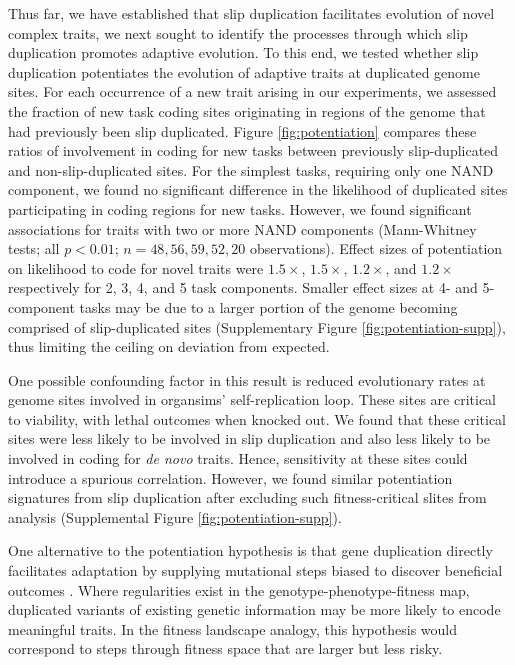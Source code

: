 Thus far, we have established that slip duplication facilitates evolution of novel complex traits, we next sought to identify the processes through which slip duplication promotes adaptive evolution.
To this end, we tested whether slip duplication potentiates the evolution of adaptive traits at duplicated genome sites.
For each occurrence of a new trait arising in our experiments, we assessed the fraction of new task coding sites originating in regions of the genome that had previously been slip duplicated.
Figure \ref{fig:potentiation} compares these ratios of involvement in coding for new tasks between previously slip-duplicated and non-slip-duplicated sites.
For the simplest tasks, requiring only one NAND component, we found no significant difference in the likelihood of duplicated sites participating in coding regions for new tasks.
However, we found significant associations for traits with two or more NAND components (Mann-Whitney tests; all $p < 0.01$; $n=48,56,59,52,20$ observations).
Effect sizes of potentiation on likelihood to code for novel traits were $1.5\times$, $1.5\times$, $1.2\times$, and $1.2\times$ respectively for 2, 3, 4, and 5 task components.
Smaller effect sizes at 4- and 5-component tasks may be due to a larger portion of the genome becoming comprised of slip-duplicated sites (Supplementary Figure \ref{fig:potentiation-supp}), thus limiting the ceiling on deviation from expected.

One possible confounding factor in this result is reduced evolutionary rates at genome sites involved in organsims' self-replication loop.
These sites are critical to viability, with lethal outcomes when knocked out.
We found that these critical sites were less likely to be involved in slip duplication and also less likely to be involved in coding for \textit{de novo} traits.
Hence, sensitivity at these sites could introduce a spurious correlation.
However, we found similar potentiation signatures from slip duplication after excluding such fitness-critical slites from analysis (Supplemental Figure \ref{fig:potentiation-supp}).

One alternative to the potentiation hypothesis is that gene duplication directly facilitates adaptation by supplying mutational steps biased to discover beneficial outcomes \citep{TODO}.
Where regularities exist in the genotype-phenotype-fitness map, duplicated variants of existing genetic information may be more likely to encode meaningful traits.
In the fitness landscape analogy, this hypothesis would correspond to steps through fitness space that are larger but less risky.

